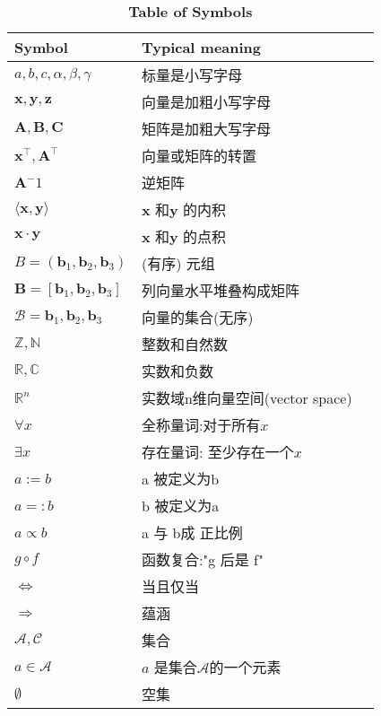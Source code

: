 \renewcommand\arraystretch{0.8}
\begin{table}
\caption*{\textbf{Table of Symbols}}
\begin{tabular}{llp{\textwidth}}
    \hline
    Symbol & Typical meaning \\
    \hline 
    \hline
    $a, b, c, \alpha, \beta, \gamma$ & 标量是小写字母 \\
    $\boldsymbol{x}, \boldsymbol{y}, \boldsymbol{z}$ & 向量是加粗小写字母 \\
    $\boldsymbol{A}, \boldsymbol{B}, \boldsymbol{C}$ & 矩阵是加粗大写字母 \\
    $\boldsymbol{x}^\top, \boldsymbol{A}^\top$  & 向量或矩阵的转置 \\
    $\boldsymbol{A}^-1$ & 逆矩阵 \\
    $\langle \boldsymbol{x}, \boldsymbol{y} \rangle$ & $\boldsymbol{x}$ 和$\boldsymbol{y}$ 的内积 \\
    $\boldsymbol{x} \cdot \boldsymbol{y}$ & $\boldsymbol{x}$ 和$\boldsymbol{y}$ 的点积 \\
    $B=(\boldsymbol{b}_1, \boldsymbol{b}_2, \boldsymbol{b}_3)$ & (有序) 元组 \\
    $\boldsymbol{B}=[\boldsymbol{b}_1, \boldsymbol{b}_2, \boldsymbol{b}_3]$ & 列向量水平堆叠构成矩阵 \\
    $\mathcal{B} ={\boldsymbol{b}_1, \boldsymbol{b}_2, \boldsymbol{b}_3}$ & 向量的集合(无序) \\
    $\mathbb{Z}, \mathbb{N}$ & 整数和自然数 \\
    $\mathbb{R}, \mathbb{C}$ & 实数和负数 \\
    $\mathbb{R}^n$ & 实数域n维向量空间(vector space) \\
    \hline
    $\forall x$ & 全称量词:对于所有$x$ \\
    $\exists x$ & 存在量词: 至少存在一个$x$ \\
    $a:=b$ & a 被定义为b \\
    $a=:b$ & b 被定义为a \\
    $a \propto b$ & a 与 b成 正比例 \\
    $g \circ f$ & 函数复合:"g 后是 f" \\
    $\Longleftrightarrow$ & 当且仅当 \\
    $\Longrightarrow$ & 蕴涵 \\
    $\mathcal{A}, \mathcal{C}$ & 集合 \\
    $a \in \mathcal{A}$ & $a$ 是集合$\mathcal{A}$的一个元素 \\
    $\emptyset$ & 空集 \\

\end{tabular}
\end{table}
